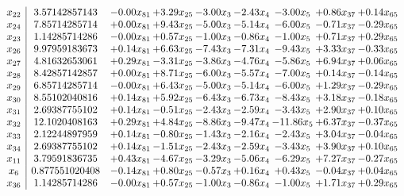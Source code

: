 \documentclass[8pt]{article}
\begin{document}
\[\begin{array}{c| c c@{\hskip 2pt} c@{\hskip 2pt} c@{\hskip 2pt} c@{\hskip 2pt} c@{\hskip 2pt} c@{\hskip 2pt} c@{\hskip 2pt} }
 x_{22}   &  3.57142857143 & -0.00 x_{81} & +  3.29 x_{25} & -3.00 x_{3} & -2.43 x_{4} & -3.00 x_{5} & +  0.86 x_{37} & +  0.14 x_{65}\\
 x_{24}   &  7.85714285714 & +  0.00 x_{81} & +  9.43 x_{25} & -5.00 x_{3} & -5.14 x_{4} & -6.00 x_{5} & -0.71 x_{37} & -0.29 x_{65}\\
 x_{23}   &  1.14285714286 & -0.00 x_{81} & +  0.57 x_{25} & -1.00 x_{3} & -0.86 x_{4} & -1.00 x_{5} & +  0.71 x_{37} & +  0.29 x_{65}\\
 x_{26}   &  9.97959183673 & +  0.14 x_{81} & +  6.63 x_{25} & -7.43 x_{3} & -7.31 x_{4} & -9.43 x_{5} & +  3.33 x_{37} & -0.33 x_{65}\\
 x_{27}   &  4.81632653061 & +  0.29 x_{81} & -3.31 x_{25} & -3.86 x_{3} & -4.76 x_{4} & -5.86 x_{5} & +  6.94 x_{37} & +  0.06 x_{65}\\
 x_{28}   &  8.42857142857 & +  0.00 x_{81} & +  8.71 x_{25} & -6.00 x_{3} & -5.57 x_{4} & -7.00 x_{5} & +  0.14 x_{37} & -0.14 x_{65}\\
 x_{29}   &  6.85714285714 & -0.00 x_{81} & +  6.43 x_{25} & -5.00 x_{3} & -5.14 x_{4} & -6.00 x_{5} & +  1.29 x_{37} & -0.29 x_{65}\\
 x_{30}   &  8.55102040816 & +  0.14 x_{81} & +  5.92 x_{25} & -6.43 x_{3} & -6.73 x_{4} & -8.43 x_{5} & +  3.18 x_{37} & -0.18 x_{65}\\
 x_{31}   &  2.69387755102 & +  0.14 x_{81} & -0.51 x_{25} & -2.43 x_{3} & -2.59 x_{4} & -3.43 x_{5} & +  2.90 x_{37} & +  0.10 x_{65}\\
 x_{32}   &  12.1020408163 & +  0.29 x_{81} & +  4.84 x_{25} & -8.86 x_{3} & -9.47 x_{4} & -11.86 x_{5} & +  6.37 x_{37} & -0.37 x_{65}\\
 x_{33}   &  2.12244897959 & +  0.14 x_{81} & -0.80 x_{25} & -1.43 x_{3} & -2.16 x_{4} & -2.43 x_{5} & +  3.04 x_{37} & -0.04 x_{65}\\
 x_{34}   &  2.69387755102 & +  0.14 x_{81} & -1.51 x_{25} & -2.43 x_{3} & -2.59 x_{4} & -3.43 x_{5} & +  3.90 x_{37} & +  0.10 x_{65}\\
 x_{11}   &  3.79591836735 & +  0.43 x_{81} & -4.67 x_{25} & -3.29 x_{3} & -5.06 x_{4} & -6.29 x_{5} & +  7.27 x_{37} & -0.27 x_{65}\\
 x_{6}   &  0.877551020408 & -0.14 x_{81} & +  0.80 x_{25} & -0.57 x_{3} & +  0.16 x_{4} & +  0.43 x_{5} & -0.04 x_{37} & +  0.04 x_{65}\\
 x_{36}   &  1.14285714286 & -0.00 x_{81} & +  0.57 x_{25} & -1.00 x_{3} & -0.86 x_{4} & -1.00 x_{5} & +  1.71 x_{37} & +  0.29 x_{65}\\

\end{array}\]
\end{document}
